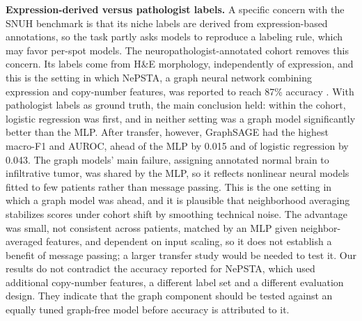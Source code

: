 \documentclass[11pt,letterpaper]{article}
\begin{document}
\textbf{Expression-derived versus pathologist labels.} A specific concern with the SNUH benchmark is that its niche labels are derived from expression-based annotations, so the task partly asks models to reproduce a labeling rule, which may favor per-spot models. The neuropathologist-annotated cohort removes this concern. Its labels come from H\&E morphology, independently of expression, and this is the setting in which NePSTA, a graph neural network combining expression and copy-number features, was reported to reach 87\% accuracy \cite{ritter2025}. With pathologist labels as ground truth, the main conclusion held: within the cohort, logistic regression was first, and in neither setting was a graph model significantly better than the MLP. After transfer, however, GraphSAGE had the highest macro-F1 and AUROC, ahead of the MLP by 0.015 and of logistic regression by 0.043. The graph models' main failure, assigning annotated normal brain to infiltrative tumor, was shared by the MLP, so it reflects nonlinear neural models fitted to few patients rather than message passing. This is the one setting in which a graph model was ahead, and it is plausible that neighborhood averaging stabilizes scores under cohort shift by smoothing technical noise. The advantage was small, not consistent across patients, matched by an MLP given neighbor-averaged features, and dependent on input scaling, so it does not establish a benefit of message passing; a larger transfer study would be needed to test it. Our results do not contradict the accuracy reported for NePSTA, which used additional copy-number features, a different label set and a different evaluation design. They indicate that the graph component should be tested against an equally tuned graph-free model before accuracy is attributed to it.
\end{document}
